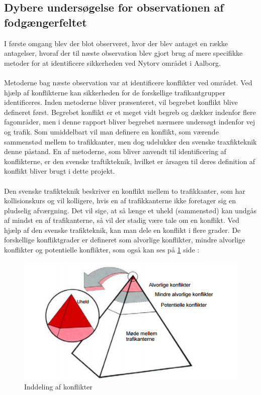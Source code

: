\subsection{Dybere undersøgelse for observationen af fodgængerfeltet}
\label{sub:dyb_undersoelse}
I første omgang blev der blot observeret, hvor der blev antaget en række antagelser, hvoraf der til næste observation blev gjort brug af mere specifikke metoder for at identificere sikkerheden ved Nytorv området i Aalborg.
~\\\\
Metoderne bag næste observation var at identificere konflikter ved området. Ved hjælp af konflikterne kan sikkerheden for de forskellige trafikantgrupper identificeres. Inden metoderne bliver præsenteret, vil begrebet konflikt blive defineret først. Begrebet konflikt er et meget vidt begreb og dækker indenfor flere fagområder, men i denne rapport bliver begrebet nærmere undersøgt indenfor vej og trafik. Som umiddelbart vil man definere en konflikt, som værende sammenstød mellem to trafikkanter, men dog udelukker den svenske traxfikteknik denne påstand. \autocite{sweconflict}
En af metoderne, som bliver anvendt til identificering af konflikterne, er den svenske traftikteknik, hvilket er årsagen til deres definition af konflikt bliver brugt i dette projekt.
~\\\\
Den svenske trafikteknik beskriver en konflikt mellem to trafikkanter, som har kollisionskurs og vil kolligere, hvis en af trafikkanterne ikke foretager sig en pludselig afværgning.\autocite{sweconflict} Det vil sige, at så længe et uheld (sammenstød) kan undgås af mindst en af trafikanterne, så vil der stadig være tale om en konflikt. Ved hjælp af den svenske trafikteknik, kan man dele en konflikt i flere grader. De forskellige konfliktgrader er defineret som alvorlige konflikter, mindre alvorlige konflikter og potentielle konflikter, som også kan ses på \cref{fig:indellingkonflikter} side \pageref{fig:indellingkonflikter}:
 \begin{figure}[htbp]
   \centering
   \begin{adjustbox}{max width=\textwidth}
     \includegraphics{figures/Billederogfigur/konflikt.png} %
  \end{adjustbox}
   \caption{Inddeling af konflikter \autocite{konflikt}}
    \label{fig:indellingkonflikter}
 \end{figure}
 \newpage


